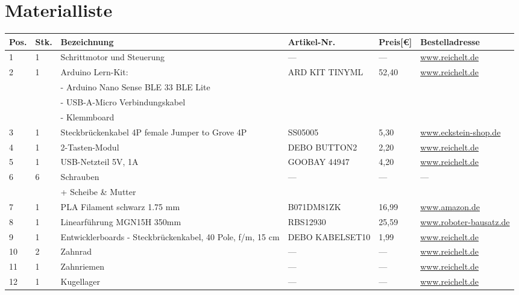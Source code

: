 \documentclass[12pt,a4paper]{scrbook}
\begin{document}
\chapter{Materialliste}
\begin{center}
	\fontsize{8}{10}\selectfont
	\begin{tabularx}{\textwidth}{|p{0.4cm}|p{0.4cm}|X|X|p{1cm}|X|}
		\hline 
		\textbf{Pos.} & \textbf{Stk.} & \textbf{Bezeichnung} & \textbf{Artikel-Nr.} & \textbf{Preis[€]} & \textbf{Bestelladresse} \\ \hline
		1 & 1 & Schrittmotor und Steuerung & --- & --- & \href{https://www.reichelt.de}{www.reichelt.de} \\
		\hline
		2 & 1 & Arduino Lern-Kit: & ARD KIT TINYML & 52,40 & \href{https://www.reichelt.de}{www.reichelt.de} \\
		&   & - Arduino Nano Sense BLE 33 BLE Lite & & & \\ 
		&   &- USB-A-Micro Verbindungskabel & & & \\
		&   &- Klemmboard & & & \\
		\hline
		3 & 1 & Steckbrückenkabel 4P female Jumper to Grove 4P & SS05005 & 5,30 & \href{https://eckstein-shop.de}{www.eckstein-shop.de} \\ 
		\hline
		4 & 1 & 2-Tasten-Modul & DEBO BUTTON2 & 2,20 & \href{https://www.reichelt.de}{www.reichelt.de} \\ 
		\hline
		5 & 1 & USB-Netzteil 5V, 1A & GOOBAY 44947 & 4,20 & \href{https://www.reichelt.de}{www.reichelt.de} \\ 
		\hline
		6 & 6 & Schrauben & --- & --- &	--- \\ 
		&   & + Scheibe \& Mutter & & \\
		\hline
		7 & 1 & PLA Filament  schwarz 1.75 mm  & B071DM81ZK & 16,99 & \href{https://wwww.amazon.de}{www.amazon.de} \\ 
		\hline
		8 & 1 & Linearführung MGN15H 350mm & RBS12930 & 25,59 & \href{https://www.roboter-bausatz.de}{www.roboter-bausatz.de} \\
		\hline
		9 & 1 & Entwicklerboards - Steckbrückenkabel, 40 Pole, f/m, 15 cm & DEBO KABELSET10 & 1,99 &
		\href{https://wwww.reichelt.de}{www.reichelt.de} \\
		\hline
		10 & 2 & Zahnrad & --- & --- &
		\href{https://wwww.reichelt.de}{www.reichelt.de} \\
		\hline
		11 & 1 & Zahnriemen & --- & --- &
		\href{https://wwww.reichelt.de}{www.reichelt.de} \\
		\hline
		12 & 1 & Kugellager & --- & --- &
		\href{https://wwww.reichelt.de}{www.reichelt.de} \\
		\hline
	\end{tabularx}
	
\end{center}
\end{document}
